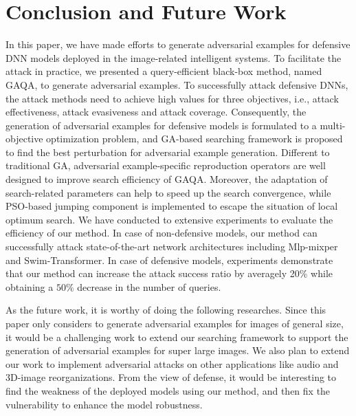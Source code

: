 \documentclass[lettersize,journal]{IEEEtran}
\begin{document}
	\section{Conclusion and Future Work}
	In this paper, we have made efforts to generate adversarial examples for defensive DNN models deployed in the image-related intelligent systems. To facilitate the attack in practice, we presented a query-efficient black-box method, named GAQA, to generate adversarial examples. To successfully attack defensive DNNs, the attack methods need to achieve high values for three objectives, i.e., attack effectiveness, attack evasiveness and attack coverage. Consequently, the generation of adversarial examples for defensive models is formulated to a multi-objective optimization problem, and GA-based searching framework is proposed to find the best perturbation for adversarial example generation. Different to traditional GA, adversarial example-specific reproduction operators are well designed to improve search efficiency of GAQA. Moreover, the adaptation of search-related parameters can help to speed up the search convergence, while PSO-based jumping component is implemented to escape the situation of local optimum search. We have conducted to extensive experiments to evaluate the efficiency of our method. In case of non-defensive models, our method can successfully attack state-of-the-art network architectures including Mlp-mixper and Swim-Transformer. In case of defensive models, experiments demonstrate that our method can increase the attack success ratio by averagely 20\% while obtaining a $50\%$ decrease in the number of queries. 
	
	As the future work, it is worthy of doing the following researches. Since this paper only considers to generate adversarial examples for images of general size, it would be a challenging work to extend our searching framework to support the generation of adversarial examples for super large images. We also plan to extend our work to implement adversarial attacks on other applications like audio and 3D-image reorganizations. From the view of defense, it would be interesting to find the weakness of the deployed models using our method, and then fix the vulnerability to enhance the model robustness.  
	
	\vfill
	
\end{document}

